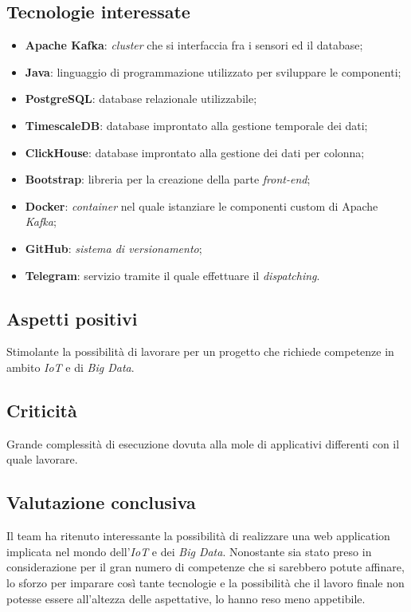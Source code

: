 \subsection{Tecnologie interessate}
\begin{itemize}
	\item \textbf{Apache Kafka\glos}: \textit{cluster\glo} che si interfaccia fra i sensori ed il database;
	\item \textbf{Java}: linguaggio di programmazione utilizzato per sviluppare le componenti;
	\item \textbf{PostgreSQL}: database relazionale utilizzabile;
	\item \textbf{TimescaleDB}: database improntato alla gestione temporale dei dati;
	\item \textbf{ClickHouse}: database improntato alla gestione dei dati per colonna;
	\item \textbf{Bootstrap}: libreria per la creazione della parte \textit{front-end\glos};
	\item \textbf{Docker\glos}: \textit{container\glo} nel quale istanziare le componenti custom di Apache \textit{Kafka\glos};
	\item \textbf{GitHub\glos}: \textit{sistema di versionamento\glo};
	\item \textbf{Telegram}: servizio tramite il quale effettuare il \textit{dispatching\glos}.
\end{itemize}

\subsection{Aspetti positivi}
Stimolante la possibilità di lavorare per un progetto che richiede competenze in ambito \textit{IoT\glo} e di \textit{Big Data\glos}.


\subsection{Criticità}
Grande complessità di esecuzione dovuta alla mole di applicativi differenti con il quale lavorare.

\subsection{Valutazione conclusiva}
Il team ha ritenuto interessante la possibilità di realizzare una web application implicata nel mondo dell'\textit{IoT\glo} e dei \textit{Big Data\glos}. Nonostante sia stato preso in considerazione per il gran numero di competenze che si sarebbero potute affinare, lo sforzo per imparare così tante tecnologie e la possibilità che il lavoro finale non potesse essere all'altezza delle aspettative, lo hanno reso meno appetibile.